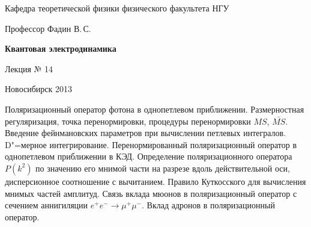 \documentclass[12pt,pagesize,paper=landscape,paper=192mm:108mm]{scrbook}
\begin{document}
\begin{titlepage}
\begin{center}
    Кафедра теоретической физики физического факультета НГУ
    \medskip

    \Large
    Профессор Фадин В.\,С.
    \bigskip

    \huge
    \textbf{Квантовая электродинамика}
    \bigskip

    \Large
    Лекция № 14
    \vfill

    \normalsize
    \vfill

    \normalsize \ccbysa\hspace{0.5em}  Новосибирск 2013
  \end{center}
\end{titlepage}
\vspace*{-1em}
\begin{center}
\vfill
  \begin{minipage}{0.65\linewidth}
    Поляризационный оператор фотона в однопетлевом
    приближении. Размерностная регуляризация, точка перенормировки,
    процедуры перенормировки $MS$, $\bar{MS}$.  Введение фейнмановских
    параметров при вычислении петлевых интегралов. D"=мерное
    интегрирование. Перенормированный поляризационный оператор в
    однопетлевом приближении в КЭД. Определение поляризационного
    оператора $P(k^2)$ по значению его мнимой части на разрезе вдоль
    действительной оси, дисперсионное соотношение с вычитанием.
    Правило Куткосского для вычисления мнимых частей амплитуд. Связь
    вклада мюонов в поляризационный оператор с сечением аннигиляции
    $e^+e^- \to \mu^+\mu^-$. Вклад адронов в поляризационный оператор.
  \end{minipage}
  \vfill

\end{center}
\end{document}

